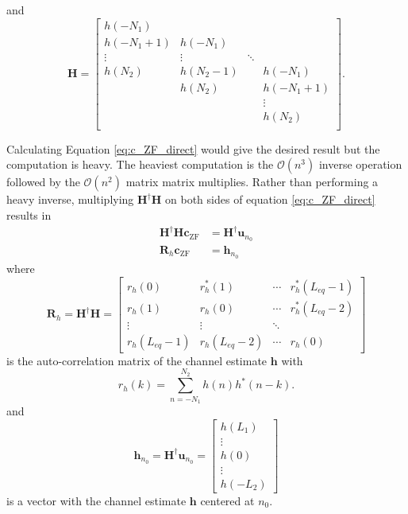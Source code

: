 and
\begin{equation} 
\mathbf{H} = 
		\begin{bmatrix}
		h(-N_1)		&  			& 		 	&  			\\
		h(-N_1+1) 	& h(-N_1)	& 		 	&  			\\
		\vdots	 	& \vdots	& \ddots 	&  			\\
		h(N_2)		& h(N_2-1) 	&  			& h(-N_1)  	\\
		 			& h(N_2) 	&  			& h(-N_1+1) \\
		 			&  	   		&  			& \vdots	\\
		 			&  	   		&  			& h(N_2)	\\
	\end{bmatrix}.
\end{equation}

Calculating Equation \eqref{eq:c_ZF_direct} would give the desired result but the computation is heavy.
The heaviest computation is the $\mathcal{O}(n^3)$ inverse operation followed by the $\mathcal{O}(n^2)$ matrix matrix multiplies.
Rather than performing a heavy inverse, multiplying $\mathbf{H}^\dagger \mathbf{H}$ on both sides of equation \eqref{eq:c_ZF_direct} results in
\begin{align}
\mathbf{H}^\dagger\mathbf{H} \mathbf{c}_\text{ZF} &= \mathbf{H}^\dagger \mathbf{u}_{n_0} \nonumber \\
\mathbf{R}_{h} \mathbf{c}_\text{ZF} &= \mathbf{h}_{n_0}
\label{eq:c_ZF_solve}
\end{align}
where
\begin{equation}
\mathbf{R}_{h} = 
\mathbf{H}^\dagger \mathbf{H} = 
		\begin{bmatrix}
		r_{h}(0)		& r^\ast_{h}(1)	& \cdots 	& r^\ast_{h}(L_{eq}-1)  	\\
		r_{h}(1) 		& r_{h}(0)		& \cdots 	& r^\ast_{h}(L_{eq}-2)  	\\
		\vdots	 			& \vdots				& \ddots 	&  							\\
		r_{h}(L_{eq}-1)	& r_{h}(L_{eq}-2)	& \cdots	& r_{h}(0)  			
	\end{bmatrix}
	\label{eq:R_h}
\end{equation}
is the auto-correlation matrix of the channel estimate $\mathbf{h}$ with 
\begin{equation}
r_{h}(k) = \sum_{n=-N_1}^{N_2} h(n) h^\ast(n-k).
\end{equation}
and 
\begin{equation}
\mathbf{h}_{n_0} = \mathbf{H}^\dagger \mathbf{u}_{n_0} = 
\begin{bmatrix} h(L_1) \\ \vdots \\ h(0) \\ \vdots \\ h(-L_2)  \end{bmatrix}
\label{eq:h_no}
\end{equation}
is a vector with the channel estimate $\mathbf{h}$ centered at $n_0$.


